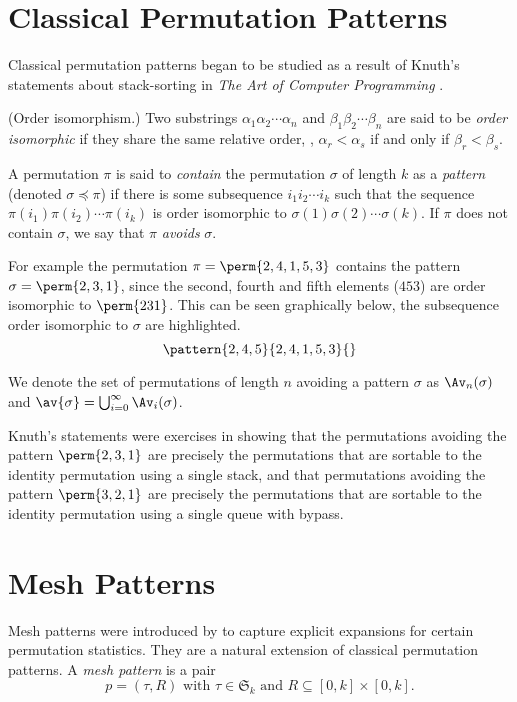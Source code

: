 \section{Classical Permutation Patterns}
Classical permutation patterns began to be studied as a result of Knuth's
statements about stack-sorting in \emph{The Art of Computer Programming}
\cite[p.~243, Ex.~5,6]{Knuth:1997:ACP:260999}.

\begin{definition}{(Order isomorphism.)}
    Two substrings \(\alpha_1\alpha_2\dotsm\alpha_n\) and
    \(\beta_1\beta_2\dotsm\beta_n\) are said to be \emph{order isomorphic}
    if they share the same relative order, \ie, \(\alpha_r<\alpha_s\) if and
    only if \(\beta_r<\beta_s\).
\end{definition}

A permutation \(\pi\) is said to \emph{contain} the permutation \(\sigma\) of
length \(k\) as a \emph{pattern} (denoted \(\sigma \preceq \pi\)) if there is some
subsequence \(i_1i_2\dotsm{}i_k\) such that the sequence
\(\pi(i_1)\pi(i_2)\dotsm\pi(i_k)\) is order isomorphic to
\(\sigma(1)\sigma(2)\dotsm\sigma(k)\). If \(\pi\) does not contain
\(\sigma\), we say that \(\pi\) \emph{avoids} \(\sigma\).

For example the permutation \(\pi = \perm{2,4,1,5,3}\) contains the pattern
\(\sigma = \perm{2,3,1}\), since the second, fourth and fifth elements
(\(453\)) are order isomorphic to \(\perm{231}\).
This can be seen graphically below, the subsequence order isomorphic to \(\sigma\)
are highlighted.
\begin{equation*}
    \pattern{2,4,5}{2,4,1,5,3}{}
\end{equation*}

We denote the set of permutations of length \(n\) avoiding a pattern \(\sigma\)
as \(\Av_n(\sigma)\) and \(\av{\sigma} = \bigcup_{i=0}^{\infty}\Av_i(\sigma)\).

Knuth's statements were exercises in showing that the permutations avoiding the
pattern \(\perm{2,3,1}\) are precisely the permutations that are sortable to
the identity permutation using a single stack, and that permutations avoiding the
pattern \(\perm{3,2,1}\) are precisely the permutations that are sortable to
the identity permutation using a single queue with bypass.

\section{Mesh Patterns}
Mesh patterns were introduced by \textcite{journals/combinatorics/BrandenC11} to
capture explicit expansions for certain permutation statistics. They are a
natural extension of classical permutation patterns. A \emph{mesh pattern} is a pair
\begin{equation*}
    p = (\tau,R)\text{ with } \tau \in \mathfrak{S}_k \text{ and } R \subseteq
    [0,k]\times [0,k].
\end{equation*}

